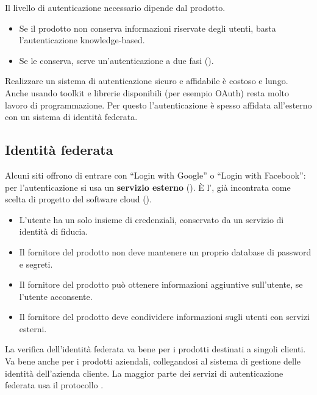 Il livello di autenticazione necessario dipende dal prodotto.
\begin{itemize}
  \item Se il prodotto non conserva informazioni riservate degli utenti, basta l'autenticazione knowledge-based.
  \item Se le conserva, serve un'autenticazione a due fasi ().
\end{itemize}
Realizzare un sistema di autenticazione sicuro e affidabile è costoso e lungo. Anche usando toolkit e librerie
disponibili (per esempio OAuth) resta molto lavoro di programmazione. Per questo l'autenticazione è spesso affidata
all'esterno con un sistema di identità federata.

\subsection{Identità federata}
\label{sec:sic-federata}

Alcuni siti offrono di entrare con ``Login with Google'' o ``Login with Facebook'': per l'autenticazione si usa un
\textbf{servizio esterno} (). È l', già incontrata come scelta di
progetto del software cloud ().
\begin{itemize}
  \item[$+$] L'utente ha un solo insieme di credenziali, conservato da un servizio di identità di fiducia.
  \item[$+$] Il fornitore del prodotto non deve mantenere un proprio database di password e segreti.
  \item[$+$] Il fornitore del prodotto può ottenere informazioni aggiuntive sull'utente, se l'utente acconsente.
  \item[$-$] Il fornitore del prodotto deve condividere informazioni sugli utenti con servizi esterni.
\end{itemize}
La verifica dell'identità federata va bene per i prodotti destinati a singoli clienti. Va bene anche per i prodotti
aziendali, collegandosi al sistema di gestione delle identità dell'azienda cliente. La maggior parte dei servizi di
autenticazione federata usa il protocollo .

